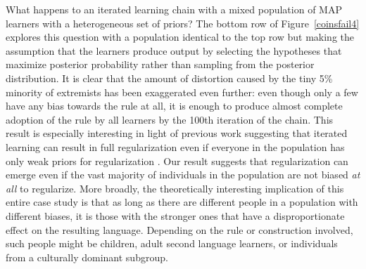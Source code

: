 \documentclass[doc]{apa6}
\begin{document}
What happens to an iterated learning chain with a mixed population of MAP learners with a heterogeneous set of priors? The bottom row of Figure~\ref{coinsfail4} explores this question with a population identical to the top row but making the assumption that the learners produce output by selecting the hypotheses that maximize posterior probability rather than sampling from the posterior distribution. It is clear that the amount of distortion caused by the tiny 5\% minority of extremists has been exaggerated even further: even though only a few have any bias towards the rule at all, it is enough to produce almost complete adoption of the rule by all learners by the 100th iteration of the chain. This result is especially interesting in light of previous work suggesting that iterated learning can result in full regularization even if everyone in the population has only weak priors for regularization  \parencite{smithwonnacott10}. Our result suggests that regularization can emerge even if the vast majority of individuals in the population are not biased {\it at all} to regularize. More broadly, the theoretically interesting implication of this entire case study is that as long as there are different people in a population with different biases, it is those with the stronger ones that have a disproportionate effect on the resulting language. Depending on the rule or construction involved, such people might be children, adult second language learners, or individuals from a culturally dominant subgroup.



\end{document}
